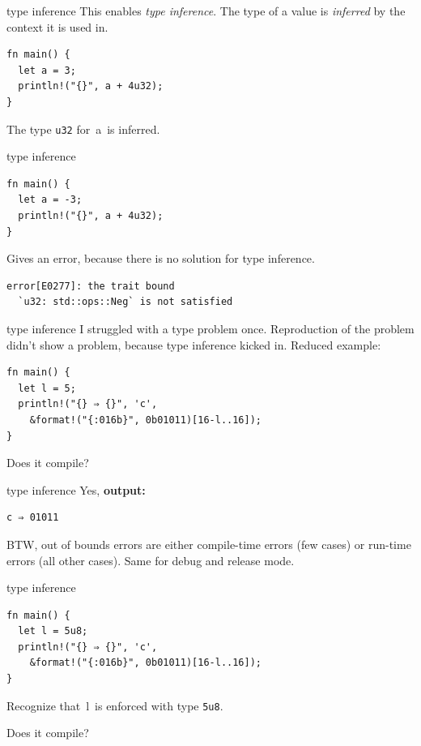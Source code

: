 \documentclass{beamer}
\newcommand\code[1]{\,{\color[HTML]{884400}#1}\,}
\begin{document}
\begin{frame}[fragile]{type inference}
  This enables \emph{type inference}. The type of a value is \emph{inferred} by the context it is used in.
  \begin{verbatim}
fn main() {
  let a = 3;
  println!("{}", a + 4u32);
}
  \end{verbatim}
  The type \texttt{u32} for \code{a} is inferred.
\end{frame}

\begin{frame}[fragile]{type inference}
  \begin{verbatim}
fn main() {
  let a = -3;
  println!("{}", a + 4u32);
}
  \end{verbatim}
  Gives an error, because there is no solution for type inference.
  \begin{verbatim}
error[E0277]: the trait bound
  `u32: std::ops::Neg` is not satisfied
  \end{verbatim}
\end{frame}


\begin{frame}[fragile]{type inference}
  I struggled with a type problem once. Reproduction of the problem didn't show a problem, because type inference kicked in. Reduced example:

  \begin{verbatim}
fn main() {
  let l = 5;
  println!("{} ⇒ {}", 'c',
    &format!("{:016b}", 0b01011)[16-l..16]);
}
  \end{verbatim}

  Does it compile?
\end{frame}

\begin{frame}[fragile]{type inference}
  Yes, \textbf{output:}
  \begin{verbatim}
c ⇒ 01011
  \end{verbatim}
  \vspace{10pt}

  BTW, out of bounds errors are either compile-time errors (few cases) or run-time errors (all other cases). Same for debug and release mode.
\end{frame}

\begin{frame}[fragile]{type inference}
  \begin{verbatim}
fn main() {
  let l = 5u8;
  println!("{} ⇒ {}", 'c',
    &format!("{:016b}", 0b01011)[16-l..16]);
}
  \end{verbatim}

  Recognize that \code{l} is enforced with type \texttt{5u8}.

  Does it compile?
\end{frame}
\end{document}
